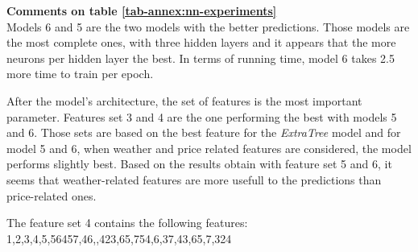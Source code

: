\noindent\textbf{Comments on table \ref{tab-annex:nn-experiments}}\\
\indent Models 6 and 5 are the two models with the better predictions. Those models are the most complete ones, with three hidden layers and it appears that the more neurons per hidden layer the best. In terms of running time, model 6 takes 2.5 more time to train per epoch.

After the model's architecture, the set of features is the most important parameter. Features set 3 and 4 are the one performing the best with models 5 and 6. Those sets are based on the best feature for the \textit{ExtraTree} model and for model 5 and 6, when weather and price related features are considered, the model performs slightly best. Based on the results obtain with feature set 5 and 6, it seems that weather-related features are more usefull to the predictions than price-related ones.

The feature set 4 contains the following features: 1,2,3,4,5,56457,46,,423,65,754,6,37,43,65,7,324


